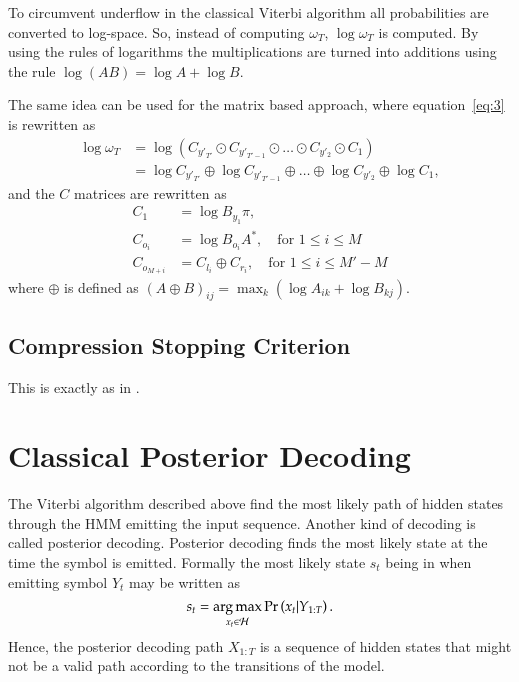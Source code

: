 To circumvent underflow in the classical Viterbi algorithm all probabilities
are converted to log-space. So, instead of computing $\omega_T$,
$\log \omega_T$ is computed. By using the rules of logarithms the
multiplications are turned into additions using the rule
$\log(AB) = \log A + \log B$. 

The same idea can be used for the matrix based approach, where
equation~\eqref{eq:3} is rewritten as
\begin{align*}
  \log \omega_T &= \log \left(C_{y'_{T'}} \odot C_{y'_{T'-1}} \odot \dots \odot
                  C_{y'_2} \odot C_1 \right) \\
                &= \log C_{y'_{T'}} \oplus \log C_{y'_{T'-1}} \oplus \dots \oplus
                  \log C_{y'_2} \oplus \log C_1,
\end{align*}
and the $C$ matrices are rewritten as
\begin{align*}
  C_1 &= \log B_{y_1} \pi, \\
  C_{o_i} &= \log B_{o_i} A^*, \quad \text{for }1 \le i \le M\\
  C_{o_{M + i}} &= C_{l_i} \oplus C_{r_i} , \quad \text{for }1 \le i \le M' - M
\end{align*}
where $\oplus$ is defined as
${ \left( A \oplus B \right)}_{ij} = \max_k \left( \log A_{ik} + \log B_{kj}
\right)$.


\subsection{Compression Stopping Criterion}
\label{sec:compr-stopp-crit}

This is exactly as in \citet{sand2013ziphmmlib}.

\section{Classical Posterior Decoding}
\label{sec:posterior-decoding-1}

The Viterbi algorithm described above find the most likely path of hidden
states through the HMM emitting the input sequence. Another kind of decoding is
called posterior decoding. Posterior decoding finds the most likely state at
the time the symbol is emitted. Formally the most likely state $s_t$ being in
when emitting symbol $Y_t$ may be written as
\begin{equation*}
  s_t = \operatorname*{arg\,max}_{x_t \in \mathcal{H}} \Pr \left(x_t | Y_{1:T} \right).
\end{equation*}
Hence, the posterior decoding path $X_{1:T}$ is a sequence of hidden states
that might not be a valid path according to the transitions of the
model. 

